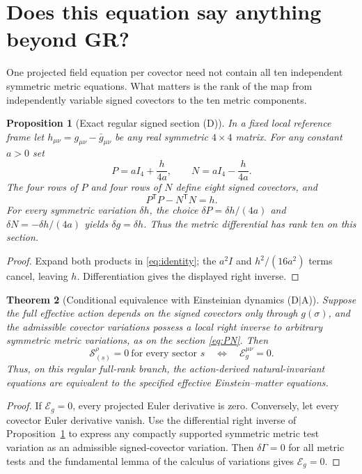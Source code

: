 \documentclass[11pt,a4paper]{article}
\newtheorem{theorem}{Theorem}[section]
\newtheorem{proposition}[theorem]{Proposition}
\newcommand{\cE}{\mathcal E}
\newcommand{\cS}{\mathscr S}
\begin{document}
\section{Does this equation say anything beyond GR?}
\label{sec:equivalence}
One projected field equation per covector need not contain all ten
independent symmetric metric equations. What matters is the rank of
the map from independently variable signed covectors to the ten
metric components.

\begin{proposition}[Exact regular signed section (D)]
\label{prop:section}
In a fixed local reference frame let $h_{\mu\nu}
=g_{\mu\nu}-\bar g_{\mu\nu}$ be any real symmetric $4\times4$
matrix. For any constant $a>0$ set
\begin{equation}\label{eq:PN}
\boxed{P=aI_4+\frac{h}{4a},\qquad
N=aI_4-\frac{h}{4a}.}
\end{equation}
The four rows of $P$ and four rows of $N$ define eight signed
covectors, and
\begin{equation}\label{eq:identity}
\boxed{P^{\mathsf T}P-N^{\mathsf T}N=h.}
\end{equation}
For every symmetric variation $\delta h$, the choice
$\delta P=\delta h/(4a)$ and $\delta N=-\delta h/(4a)$
yields $\delta g=\delta h$. Thus the metric differential has rank ten
on this section.
\end{proposition}
\begin{proof}
Expand both products in \eqref{eq:identity}; the $a^2I$
and $h^2/(16a^2)$ terms cancel, leaving $h$.
Differentiation gives the displayed right inverse.
\end{proof}

\begin{theorem}[Conditional equivalence with Einsteinian dynamics (D$\mid$A)]
\label{thm:equiv}
Suppose the full effective action depends on the signed covectors
\emph{only through} $g(\sigma)$, and the admissible covector
variations possess a local right inverse to arbitrary symmetric
metric variations, as on the section \eqref{eq:PN}. Then
\begin{equation}\label{eq:equivalence}
\boxed{\cS_{(s)}^\rho=0\ \text{for every sector }s
\quad\Longleftrightarrow\quad
\cE_g^{\mu\nu}=0.}
\end{equation}
Thus, on this regular full-rank branch, the action-derived
natural-invariant equations are equivalent to the \emph{specified}
effective Einstein--matter equations.
\end{theorem}
\begin{proof}
If $\cE_g=0$, every projected Euler derivative is zero.
Conversely, let every covector Euler derivative vanish.
Use the differential right inverse of Proposition~\ref{prop:section}
to express any compactly supported symmetric metric test variation
as an admissible signed-covector variation. Then
$\delta\Gamma=0$ for all metric tests and the fundamental lemma
of the calculus of variations gives $\cE_g=0$.
\end{proof}
\end{document}
